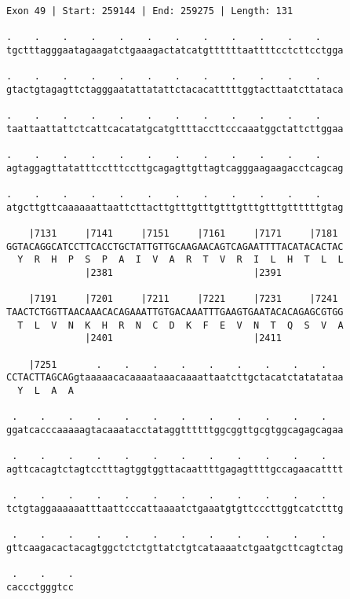 \documentclass{article}
\begin{document}
\begin{Verbatim}[fontfamily=courier]
Exon 49 | Start: 259144 | End: 259275 | Length: 131

.    .    .    .    .    .    .    .    .    .    .    .    
tgctttagggaatagaagatctgaaagactatcatgttttttaattttcctcttcctgga

.    .    .    .    .    .    .    .    .    .    .    .    
gtactgtagagttctagggaatattatattctacacatttttggtacttaatcttataca

.    .    .    .    .    .    .    .    .    .    .    .    
taattaattattctcattcacatatgcatgttttaccttcccaaatggctattcttggaa

.    .    .    .    .    .    .    .    .    .    .    .    
agtaggagttatatttcctttccttgcagagttgttagtcagggaagaagacctcagcag

.    .    .    .    .    .    .    .    .    .    .    .    
atgcttgttcaaaaaattaattcttacttgtttgtttgtttgtttgtttgttttttgtag

    |7131     |7141     |7151     |7161     |7171     |7181 
GGTACAGGCATCCTTCACCTGCTATTGTTGCAAGAACAGTCAGAATTTTACATACACTAC
  Y  R  H  P  S  P  A  I  V  A  R  T  V  R  I  L  H  T  L  L
              |2381                         |2391           

    |7191     |7201     |7211     |7221     |7231     |7241 
TAACTCTGGTTAACAAACACAGAAATTGTGACAAATTTGAAGTGAATACACAGAGCGTGG
  T  L  V  N  K  H  R  N  C  D  K  F  E  V  N  T  Q  S  V  A
              |2401                         |2411           

    |7251       .    .    .    .    .    .    .    .    .   
CCTACTTAGCAGgtaaaaacacaaaataaacaaaattaatcttgctacatctatatataa
  Y  L  A  A                                                

 .    .    .    .    .    .    .    .    .    .    .    .   
ggatcacccaaaaagtacaaatacctataggttttttggcggttgcgtggcagagcagaa

 .    .    .    .    .    .    .    .    .    .    .    .   
agttcacagtctagtcctttagtggtggttacaattttgagagttttgccagaacatttt

 .    .    .    .    .    .    .    .    .    .    .    .   
tctgtaggaaaaaatttaattcccattaaaatctgaaatgtgttcccttggtcatctttg

 .    .    .    .    .    .    .    .    .    .    .    .   
gttcaagacactacagtggctctctgttatctgtcataaaatctgaatgcttcagtctag

 .    .    .
caccctgggtcc
\end{Verbatim}
\newpage
\end{document}

